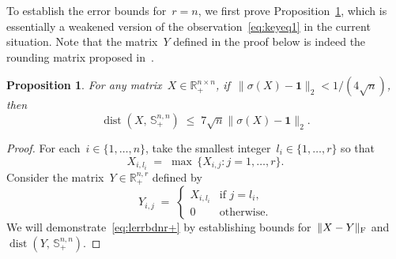 \documentclass[11pt,a4paper]{article}  %
\newtheorem{proposition}{Proposition}%
\theoremstyle{definition}
\DeclareMathOperator{\dist}{dist}
\newcommand{\RR}{\mathbb{R}}
\newcommand{\col}{r}
\newcommand{\stf}[1]{\mathbb{S}^{#1}}
\newcommand{\fro}{{\scriptstyle{\textnormal{F}}}}
\newcommand{\ones}{\mathbf{1}}
\begin{document}
To establish the error bounds for~$\col = n$, we first prove Proposition~\ref{prop:lerrbdnr+}, which
is essentially a weakened version of the observation~\eqref{eq:keyeq1} in the current situation.
Note that the matrix~$Y$ defined in the proof below is indeed the rounding matrix proposed
in~\cite[Procedure~3.1]{Jiang_Meng_Wen_Chen_2023}.
\begin{proposition}
    \label{prop:lerrbdnr+}
    For any matrix~$X\in\RR^{n\times n}_+$, if~$\|\sigma(X) - \ones\|_2 < 1/(4\sqrt{n})$, then
    \begin{equation}
    \label{eq:lerrbdnr+}
        \dist(X,\,\stf{n,n}_+)  \;\le\;7\sqrt{n} \|\sigma(X) - \ones\|_2.
    \end{equation}
\end{proposition}
\begin{proof}
    For each~$i \in \{1, \dots, n\}$, take the smallest integer~$l_i \in \{1,\dots, \col\}$ so that
    \begin{equation}
        \nonumber
        X_{i,l_i} \;=\; \max\, \{X_{i,j} \mathrel{:}  j = 1, \dots, \col\}.
    \end{equation}
    Consider the matrix~$Y \in \RR^{n,\col}_+$ defined by
    \begin{equation}
        \label{eq:y}
        Y_{i, j} \;=\;
        \begin{cases}
            X_{i,l_i} & \text{if } j = l_i,\\
            0 & \text{otherwise}.
        \end{cases}
    \end{equation}
    We will demonstrate~\eqref{eq:lerrbdnr+} by establishing bounds for~$\|X-Y\|_\fro$ and~$\dist(Y,\,\stf{n,n}_+)$.


\end{proof}
\end{document}
